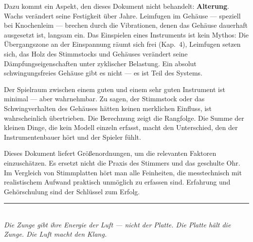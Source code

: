 \documentclass[11pt,a4paper]{article}
\begin{document}
Dazu kommt ein Aspekt, den dieses Dokument nicht behandelt: \textbf{Alterung}. Wachs verändert seine Festigkeit über Jahre. Leimfugen im Gehäuse --- speziell bei Knochenleim --- brechen durch die Vibrationen, denen das Gehäuse dauerhaft ausgesetzt ist, langsam ein. Das Einspielen eines Instruments ist kein Mythos: Die Übergangszone an der Einspannung räumt sich frei (Kap.~4), Leimfugen setzen sich, das Holz des Stimmstocks und Gehäuses verändert seine Dämpfungseigenschaften unter zyklischer Belastung. Ein absolut schwingungsfreies Gehäuse gibt es nicht --- es ist Teil des Systems.

Der Spielraum zwischen einem guten und einem sehr guten Instrument ist minimal --- aber wahrnehmbar. Zu sagen, der Stimmstock oder das Schwingverhalten des Gehäuses hätten keinen merklichen Einfluss, ist wahrscheinlich übertrieben. Die Berechnung zeigt die Rangfolge. Die Summe der kleinen Dinge, die kein Modell einzeln erfasst, macht den Unterschied, den der Instrumentenbauer hört und der Spieler fühlt.

Dieses Dokument liefert Größenordnungen, um die relevanten Faktoren einzuschätzen. Es ersetzt nicht die Praxis des Stimmers und das geschulte Ohr. Im Vergleich von Stimmplatten hört man alle Feinheiten, die messtechnisch mit realistischem Aufwand praktisch unmöglich zu erfassen sind. Erfahrung und Gehörschulung sind der Schlüssel zum Erfolg.

\vspace{3mm}
\begin{center}
\textcolor{accentred}{\rule{0.6\textwidth}{1pt}}\\[4pt]
{\small\itshape Die Zunge gibt ihre Energie der Luft --- nicht der Platte. Die Platte hält die Zunge. Die Luft macht den Klang.}
\end{center}
\end{document}
